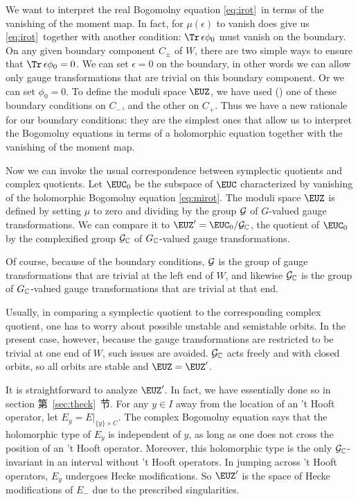 We want to interpret the real Bogomolny equation \eqref{eq:irot}\ in terms
of the vanishing of the moment map.  In fact, for $\mu(\epsilon)$
to vanish does give us \eqref{eq:irot}\ together with another condition:
$\Tr\,\epsilon\phi_0$ must vanish on the boundary.  On any given
boundary component $C_\pm$ of $W$, there are two simple ways to
ensure that $\Tr\,\epsilon\phi_0=0$.  We can set $\epsilon=0$ on
the boundary, in other words we can allow only gauge
transformations that are trivial on this boundary component. Or we
can set $\phi_0=0$.  To define the moduli space ${\EUZ}$, we have
used (\xutampo) one of these boundary conditions on $C_-$, and the
other on $C_+$.  Thus we have a new rationale for our boundary
conditions: they are the simplest ones that allow us to interpret
the Bogomolny equations in terms of a holomorphic equation
together with the vanishing of the moment map.

Now we can invoke the usual correspondence between symplectic
quotients and complex quotients.  Let ${\EUC}_0$ be the subspace
of $\EUC$ characterized by vanishing of the holomorphic Bogomolny
equation \eqref{eq:mirot}.  The moduli space ${\EUZ}$ is defined by setting
$\mu $ to zero and dividing by the group $\cal G$ of $G$-valued
gauge transformations.  We can compare it to
${\EUZ}'={\EUC}_0/{\cal G}_{\Bbb{C}}$, the quotient of ${\EUC}_0$
by the complexified group ${\cal G}_{\Bbb{C}}$ of ${
G}_{\Bbb{C}}$-valued gauge transformations.

Of course, because of the boundary conditions, $\cal G$ is the
group of gauge transformations that are trivial at the left end of
$W$, and likewise ${\cal  G}_{\Bbb{C}}$ is the group of
$G_{\Bbb{C}}$-valued gauge transformations that are trivial at
that end.

 Usually, in comparing a symplectic quotient to the
corresponding complex quotient, one has to worry about possible
unstable and semistable orbits.  In the present case, however,
because the gauge transformations are restricted to be trivial at
one end of $W$, such issues are avoided.  ${\cal G}_{\Bbb{C}}$
acts freely and with closed orbits, so all orbits are stable and
${\EUZ}={\EUZ}'$.

It is straightforward to analyze ${\EUZ}'$.  In fact, we have
essentially done so in section 第~\ref{sec:theck}~节.  For any $y\in I$ away from
the location of an 't Hooft operator, let $E_y=E|_{ \{y\}\times
C}$. The complex Bogomolny equation says that the holomorphic type
of $E_y$ is independent of $y$, as long as one does not cross the
position of an 't Hooft operator.  Moreover, this holomorphic type
is the only ${\cal G}_{\Bbb{C}}$-invariant in an interval without
't Hooft operators.  In jumping across 't Hooft operators, $E_y$
undergoes Hecke modifications. So ${\EUZ}'$ is the space of Hecke
modifications of $E_-$ due to the prescribed singularities.

